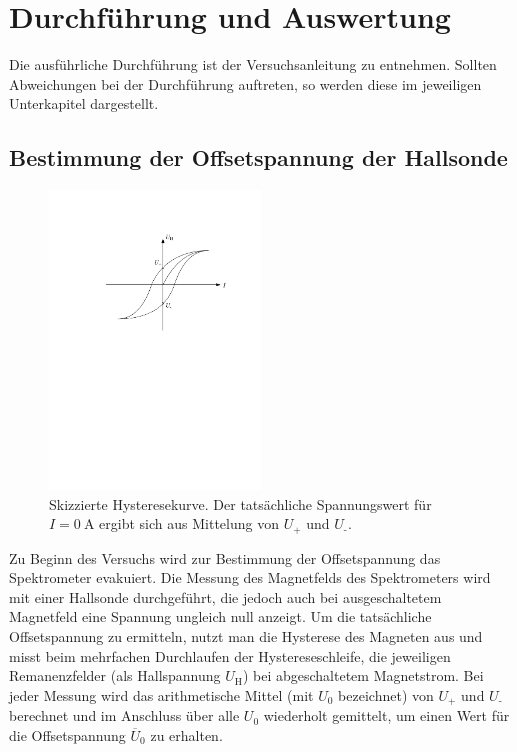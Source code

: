 \documentclass[11pt, a4paper]{article}
\numberwithin{equation}{section}
\begin{document}
\section{Durchführung und Auswertung}
Die ausführliche Durchführung ist der Versuchsanleitung \cite{anleitung} zu entnehmen.
Sollten Abweichungen bei der Durchführung auftreten, so werden diese im jeweiligen Unterkapitel dargestellt.

\subsection{Bestimmung der Offsetspannung der Hallsonde}
\label{ssec:offsetspannung}
\begin{figure}
	\centering
	\includegraphics[width=0.5\textwidth]{./figures/hysterese.pdf}
	\caption{Skizzierte Hysteresekurve. Der tatsächliche Spannungswert für $I=\SI{0}{\ampere}$ ergibt sich aus Mittelung von $U_\text{+}$ und $U_\text{-}$.}
	\label{fig:hysterese}
\end{figure}
Zu Beginn des Versuchs wird zur Bestimmung der Offsetspannung das Spektrometer evakuiert.
Die Messung des Magnetfelds des Spektrometers wird mit einer Hallsonde durchgeführt, die jedoch auch bei ausgeschaltetem Magnetfeld eine Spannung ungleich null anzeigt.
Um die tatsächliche Offsetspannung zu ermitteln, nutzt man die Hysterese des Magneten aus und misst beim mehrfachen Durchlaufen der Hystereseschleife, die jeweiligen Remanenzfelder (als Hallspannung $U_\text{H}$) bei abgeschaltetem Magnetstrom.
Bei jeder Messung wird das arithmetische Mittel (mit $U_0$ bezeichnet) von $U_\text{+}$ und $U_\text{-}$ berechnet und im Anschluss über alle $U_0$ wiederholt gemittelt, um einen Wert für die Offsetspannung $\overline{U}_0$ zu erhalten.
\end{document}
